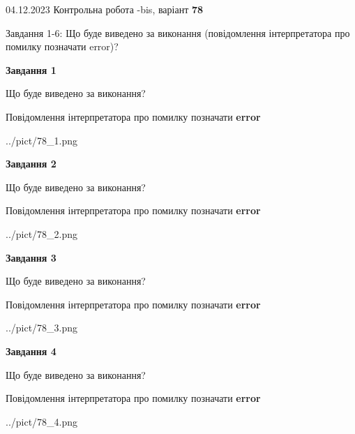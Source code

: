 \documentclass[12pt, ukrainian]{article}
\begin{document}
{{04.12.2023 Контрольна робота -bis, варіант  \No \textbf { 78 }\par}}
{

Завдання 1-6: Що буде виведено за виконання (повідомлення інтерпретатора про помилку позначати error)?


{\begin {center}\textbf{Завдання 1}\end {center}}\par
Що буде виведено за виконання? \par
Повідомлення інтерпретатора про помилку позначати \textbf{error}

\begin{center}
	{../pict/78_1.png}
\end{center}
\newpage

{\begin {center}\textbf{Завдання 2}\end {center}}\par
Що буде виведено за виконання? \par
Повідомлення інтерпретатора про помилку позначати \textbf{error}

\begin{center}
	{../pict/78_2.png}
\end{center}
\newpage

{\begin {center}\textbf{Завдання 3}\end {center}}\par
Що буде виведено за виконання? \par
Повідомлення інтерпретатора про помилку позначати \textbf{error}

\begin{center}
	{../pict/78_3.png}
\end{center}
\newpage

{\begin {center}\textbf{Завдання 4}\end {center}}\par
Що буде виведено за виконання? \par
Повідомлення інтерпретатора про помилку позначати \textbf{error}

\begin{center}
	{../pict/78_4.png}
\end{center}
\newpage

}
\end{document}
